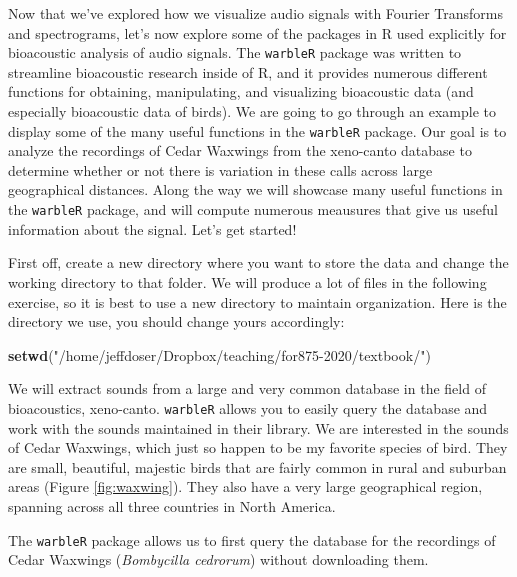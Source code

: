 \documentclass[
]{krantz}
\makeatletter
\newenvironment{Shaded}{\begin{snugshade}}{\end{snugshade}}
\newcommand{\KeywordTok}[1]{\textcolor[rgb]{0.27,0.27,0.27}{\textbf{#1}}}
\newcommand{\NormalTok}[1]{#1}
\newcommand{\StringTok}[1]{\textcolor[rgb]{0.5,0.5,0.5}{#1}}
\newenvironment{kframe}{%
\medskip{}
\setlength{\fboxsep}{.8em}
 \def\at@end@of@kframe{}%
 \ifinner\ifhmode%
  \def\at@end@of@kframe{\end{minipage}}%
  \begin{minipage}{\columnwidth}%
 \fi\fi%
 \def\FrameCommand##1{\hskip\@totalleftmargin \hskip-\fboxsep
 \colorbox{shadecolor}{##1}\hskip-\fboxsep
     \hskip-\linewidth \hskip-\@totalleftmargin \hskip\columnwidth}%
 \MakeFramed {\advance\hsize-\width
   \@totalleftmargin\z@ \linewidth\hsize
   \@setminipage}}%
 {\par\unskip\endMakeFramed%
 \at@end@of@kframe}
\renewenvironment{Shaded}{\begin{kframe}}{\end{kframe}}
\makeatother
\begin{document}
Now that we've explored how we visualize audio signals with Fourier Transforms and spectrograms, let's now explore some of the packages in R used explicitly for bioacoustic analysis of audio signals. The \texttt{warbleR} package was written to streamline bioacoustic research inside of R, and it provides numerous different functions for obtaining, manipulating, and visualizing bioacoustic data (and especially bioacoustic data of birds). We are going to go through an example to display some of the many useful functions in the \texttt{warbleR} package. Our goal is to analyze the recordings of Cedar Waxwings from the xeno-canto database to determine whether or not there is variation in these calls across large geographical distances. Along the way we will showcase many useful functions in the \texttt{warbleR} package, and will compute numerous meausures that give us useful information about the signal. Let's get started!

First off, create a new directory where you want to store the data and change the working directory to that folder. We will produce a lot of files in the following exercise, so it is best to use a new directory to maintain organization. Here is the directory we use, you should change yours accordingly:

\begin{Shaded}
\begin{Highlighting}[]
\KeywordTok{setwd}\NormalTok{(}\StringTok{"/home/jeffdoser/Dropbox/teaching/for875{-}2020/textbook/"}\NormalTok{) }
\end{Highlighting}
\end{Shaded}

We will extract sounds from a large and very common database in the field of bioacoustics, xeno-canto. \texttt{warbleR} allows you to easily query the database and work with the sounds maintained in their library. We are interested in the sounds of Cedar Waxwings, which just so happen to be my favorite species of bird. They are small, beautiful, majestic birds that are fairly common in rural and suburban areas (Figure \ref{fig:waxwing}). They also have a very large geographical region, spanning across all three countries in North America.

The \texttt{warbleR} package allows us to first query the database for the recordings of Cedar Waxwings (\emph{Bombycilla cedrorum}) without downloading them.
\end{document}
